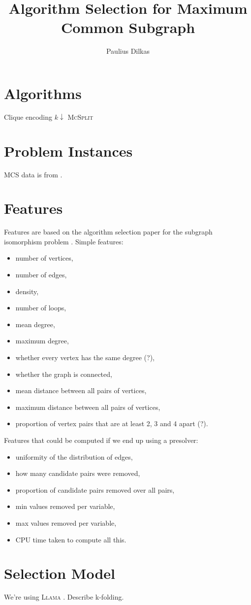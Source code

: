 \documentclass{article}
\author{Paulius Dilkas}
\title{Algorithm Selection for Maximum Common Subgraph}
\begin{document}
\maketitle

\section{Algorithms}
Clique encoding \cite{DBLP:conf/cp/McCreeshNPS16}
$k\downarrow$ \cite{DBLP:conf/aaai/HoffmannMR17}
\textsc{McSplit} \cite{DBLP:conf/ijcai/McCreeshPT17}

\section{Problem Instances}
MCS data is from \cite{DeSanto2003}\cite{foggia2001-2}.

\section{Features}
Features are based on the algorithm selection paper for the subgraph isomorphism
problem \cite{DBLP:conf/lion/KotthoffMS16}. Simple features:

\begin{itemize}
\item number of vertices,
\item number of edges,
\item density,
\item number of loops,
\item mean degree,
\item maximum degree,
\item whether every vertex has the same degree (?),
\item whether the graph is connected,
\item mean distance between all pairs of vertices,
\item maximum distance between all pairs of vertices,
\item proportion of vertex pairs that are at least 2, 3 and 4 apart (?).
\end{itemize}

Features that could be computed if we end up using a presolver:

\begin{itemize}
\item uniformity of the distribution of edges,
\item how many candidate pairs were removed,
\item proportion of candidate pairs removed over all pairs,
\item min values removed per variable,
\item max values removed per variable,
\item CPU time taken to compute all this.
\end{itemize}

\section{Selection Model}
We're using \textsc{Llama} \cite{kotthoff_llama_2013}. Describe k-folding.

\printbibliography
\end{document}

